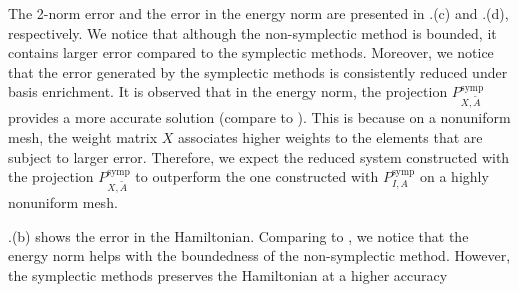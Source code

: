 The 2-norm error and the error in the energy norm are presented in .(c) and .(d), respectively. We notice that although the non-symplectic method is bounded, it contains larger error compared to the symplectic methods. Moreover, we notice that the error generated by the symplectic methods is consistently reduced under basis enrichment. It is observed that in the energy norm, the projection $P_{X,\tilde A}^{\text{symp}}$ provides a more accurate solution (compare to ). This is because on a nonuniform mesh, the weight matrix $X$ associates higher weights to the elements that are subject to larger error. Therefore, we expect the reduced system constructed with the projection $P_{X,\tilde A}^{\text{symp}}$ to outperform the one constructed with $P_{I,A}^{\text{symp}}$ on a highly nonuniform mesh.

.(b) shows the error in the Hamiltonian. Comparing to , we notice that the energy norm helps with the boundedness of the non-symplectic method. However, the symplectic methods preserves the Hamiltonian at a higher accuracy

